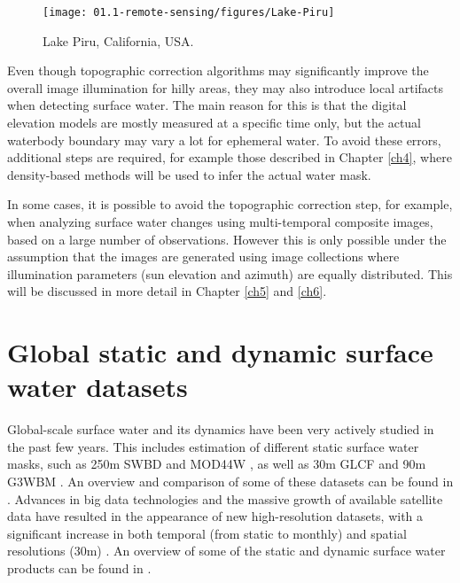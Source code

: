 \begin{wrapfigure}{r}{0.5\textwidth}
	\begin{center}
		\texttt{[image: 01.1-remote-sensing/figures/Lake-Piru]}
	\end{center}
	\caption{Lake Piru, California, USA. \protect \footnotemark}
\end{wrapfigure}


Even though topographic correction algorithms may significantly improve the overall image illumination for hilly areas, they may also introduce local artifacts when detecting surface water. The main reason for this is that the digital elevation models are mostly measured at a specific time only, but the actual waterbody boundary may vary a lot for ephemeral water. To avoid these errors, additional steps are required, for example those described in Chapter \ref{ch4}, where density-based methods will be used to infer the actual water mask.

In some cases, it is possible to avoid the topographic correction step, for example, when analyzing surface water changes using multi-temporal composite images, based on a large number of observations. However this is only possible under the assumption that the images are generated using image collections where illumination parameters (sun elevation and azimuth) are equally distributed. This will be discussed in more detail in Chapter \ref{ch5} and \ref{ch6}.


\section{Global static and dynamic surface water datasets}

Global-scale surface water and its dynamics have been very actively studied in the past few years. This includes estimation of different static surface water masks, such as 250m SWBD \citet{farr2007shuttle} and MOD44W \citet{carroll2009new}, as well as 30m GLCF \citet{feng2016global} and 90m G3WBM \citet{yamazaki2015development}.
An overview and comparison of some of these datasets can be found in \citet{lamarche2017compilation}. Advances in big data technologies and the massive growth of available satellite data have resulted in the appearance of new high-resolution datasets, with a significant increase in both temporal (from static to monthly) and spatial resolutions (30m) \citet{pekel2016high}. An overview of some of the static and dynamic surface water products can be found in \citet{yamazaki2016hydrology}.

